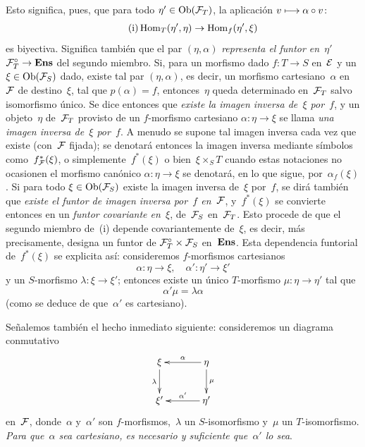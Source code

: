 Esto significa, pues, que para todo $\eta'\in\Ob(\cal{F}_T)$, la
aplicación $v\mto\alpha\circ v$:
\begin{equation}
\tag{i} \Hom_T(\eta',\eta)\to\Hom_f(\eta',\xi)
\end{equation}
es biyectiva. Significa también que el par $(\eta,\alpha)$
\emph{representa el funtor en~$\eta'$} $\cal{F}^{\circ}_T\to\Ens$ del
segundo miembro. Si, para un morfismo dado $f\colon T\to S$ en~$\cal{E}$
y un $\xi\in\Ob(\cal{F}_S)$ dado, existe tal par $(\eta,\alpha)$, es decir,
un morfismo
cartesiano~$\alpha$ en~$\cal{F}$ de destino~$\xi$, tal que
$p(\alpha)=f$, entonces~$\eta$ queda determinado en~$\cal{F}_T$ salvo
isomorfismo único. Se dice entonces que \emph{existe la imagen inversa
de~$\xi$ por~$f$}, y un objeto~$\eta$ de~$\cal{F}_T$ provisto de un
$f$-morfismo cartesiano $\alpha\colon\eta\to\xi$ se llama \emph{una imagen
inversa de~$\xi$ por~$f$}.
%
A menudo se supone
tal imagen inversa cada vez que existe (con~$\cal{F}$ fijada); se denotará
entonces la imagen inversa mediante símbolos como~$f^*_{\cal{F}}(\xi)$, o
simplemente~$f^*(\xi)$
\label{indnot:fo}%
{o bien~$\xi\times_S T$}
cuando estas notaciones no ocasionen
el morfismo canónico $\alpha\colon\eta\to\xi$ se denotará, en lo que
sigue, por~$\alpha_f(\xi)$.
\label{indnot:fp}%
Si para todo $\xi\in\Ob(\cal{F}_S)$ existe la imagen inversa de~$\xi$
por~$f$, se dirá también que \emph{existe el funtor de imagen inversa
por~$f$ en~$\cal{F}$}, y~$f^*(\xi)$ se convierte entonces en un
\emph{funtor covariante en~$\xi$}, de~$\cal{F}_S$ en~$\cal{F}_T$. Esto
procede de que el segundo miembro de~(i) depende covariantemente de~$\xi$,
es decir, más precisamente, designa un funtor de
$\cal{F}^{\circ}_T\times\cal{F}_S$ en~$\Ens$. Esta dependencia funtorial
de~$f^*(\xi)$ se explicita así: consideremos $f$-morfismos cartesianos
$$
\alpha\colon\eta\to\xi,\quad\alpha'\colon\eta'\to\xi'
$$
y un $S$-morfismo $\lambda\colon\xi\to\xi'$; entonces existe un único
$T$-morfismo $\mu\colon\eta\to\eta'$ tal que
$$
\alpha'\mu=\lambda\alpha
$$
(como se deduce de que~$\alpha'$ es cartesiano).

Señalemos también el hecho inmediato siguiente: consideremos un diagrama
conmutativo
$$
\xymatrix@C=1.2cm{
\xi\ar[d]_-{\lambda}&\ar[l]_-{\alpha}\eta\ar[d]^-{\mu}\\
\xi'&\ar[l]_-{\alpha'}\eta'
}
$$
en~$\cal{F}$,
donde~$\alpha$ y~$\alpha'$ son $f$-morfismos,~$\lambda$ un
$S$-isomorfismo y~$\mu$ un $T$-isomorfismo. \emph{Para que~$\alpha$ sea
cartesiano, es necesario y suficiente que~$\alpha'$ lo sea}.

